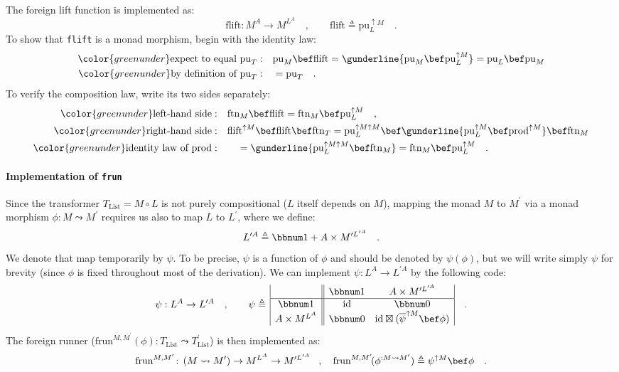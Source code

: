 The foreign lift function is implemented as:
\[
\text{flift}:M^{A}\rightarrow M^{L^{A}}\quad,\quad\quad\text{flift}\triangleq\text{pu}_{L}^{\uparrow M}\quad.
\]
To show that \lstinline!flift! is a monad morphism, begin with the
identity law:
\begin{align*}
{\color{greenunder}\text{expect to equal }\text{pu}_{T}:}\quad & \text{pu}_{M}\bef\text{flift}=\gunderline{\text{pu}_{M}\bef\text{pu}_{L}^{\uparrow M}}=\text{pu}_{L}\bef\text{pu}_{M}\\
{\color{greenunder}\text{by definition of }\text{pu}_{T}:}\quad & =\text{pu}_{T}\quad.
\end{align*}
To verify the composition law, write its two sides separately:
\begin{align*}
{\color{greenunder}\text{left-hand side}:}\quad & \text{ftn}_{M}\bef\text{flift}=\text{ftn}_{M}\bef\text{pu}_{L}^{\uparrow M}\quad,\\
{\color{greenunder}\text{right-hand side}:}\quad & \text{flift}^{\uparrow M}\bef\text{flift}\bef\text{ftn}_{T}=\text{pu}_{L}^{\uparrow M\uparrow M}\bef\gunderline{\text{pu}_{L}^{\uparrow M}\bef\text{prod}^{\uparrow M}}\bef\text{ftn}_{M}\\
{\color{greenunder}\text{identity law of }\text{prod}:}\quad & \quad=\gunderline{\text{pu}_{L}^{\uparrow M\uparrow M}\bef\text{ftn}_{M}}=\text{ftn}_{M}\bef\text{pu}_{L}^{\uparrow M}\quad.
\end{align*}


\paragraph{Implementation of \texttt{frun}}

Since the transformer $T_{\text{List}}=M\circ L$ is not purely compositional
($L$ itself depends on $M$), mapping the monad $M$ to $M^{\prime}$
via a monad morphism $\phi:M\leadsto M^{\prime}$ requires us also
to map $L$ to $L^{\prime}$, where we define: 
\[
L^{\prime A}\triangleq\bbnum 1+A\times M^{\prime L^{\prime A}}\quad.
\]
We denote that map temporarily by $\psi$. To be precise, $\psi$
is a function of $\phi$ and should be denoted by $\psi(\phi)$, but
we will write simply $\psi$ for brevity (since $\phi$ is fixed throughout
most of the derivation). We can implement $\psi:L^{A}\rightarrow L^{\prime A}$
by the following code:
\begin{equation}
\psi:L^{A}\rightarrow L^{\prime A}\quad,\quad\quad\psi\triangleq\,\begin{array}{|c||cc|}
 & \bbnum 1 & A\times M^{\prime L^{\prime A}}\\
\hline \bbnum 1 & \text{id} & \bbnum 0\\
A\times M^{L^{A}} & \bbnum 0 & \text{id}\boxtimes(\overline{\psi}^{\uparrow M}\bef\phi)
\end{array}\quad.\label{eq:list-monad-definition-of-psi}
\end{equation}
The foreign runner ($\text{frun}^{M,M^{\prime}}(\phi):T_{\text{List}}\leadsto T_{\text{List}}^{\prime}$)
is then implemented as:
\[
\text{frun}^{M,M^{\prime}}\!:\,(M\leadsto M^{\prime})\rightarrow M^{L^{A}}\rightarrow M^{\prime L^{\prime A}}\!\quad,\quad\text{frun}^{M,M^{\prime}}\!(\phi^{:M\leadsto M^{\prime}})\triangleq\psi^{\uparrow M}\bef\phi\quad.
\]


